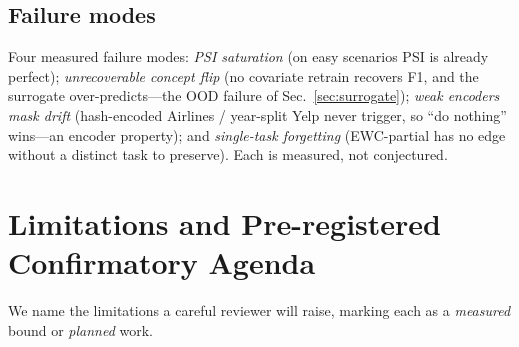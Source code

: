 \documentclass[conference]{IEEEtran}
\begin{document}
\subsection{Failure modes}\label{sec:failures}
Four measured failure modes: \emph{PSI saturation} (on easy scenarios PSI
is already perfect); \emph{unrecoverable concept flip} (no covariate
retrain recovers F1, and the surrogate over-predicts---the OOD failure of
Sec.~\ref{sec:surrogate}); \emph{weak encoders mask drift} (hash-encoded
Airlines / year-split Yelp never trigger, so ``do nothing'' wins---an
encoder property); and \emph{single-task forgetting} (EWC-partial has no
edge without a distinct task to preserve). Each is measured, not
conjectured.

\section{Limitations and Pre-registered Confirmatory Agenda}\label{sec:limits}
We name the limitations a careful reviewer will raise, marking each as a
\emph{measured} bound or \emph{planned} work.
\end{document}
